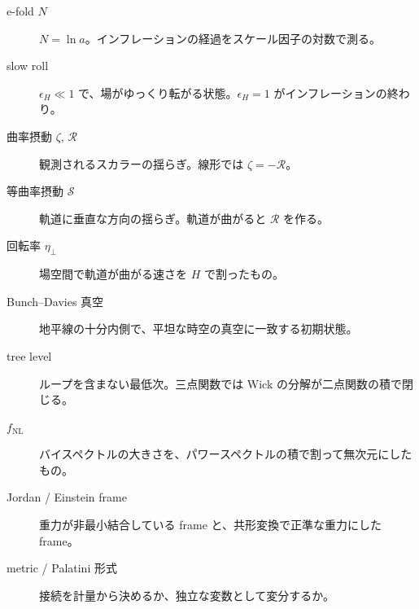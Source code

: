 \documentclass[a4paper,11pt]{ltjsarticle}
\newcommand{\fnl}{f_{\mathrm{NL}}}
\begin{document}
\begin{description}
\item[e-fold $N$] $N=\ln a$。インフレーションの経過をスケール因子の対数で測る。
\item[slow roll] $\epsilon_H\ll1$ で、場がゆっくり転がる状態。$\epsilon_H=1$ がインフレーションの終わり。
\item[曲率摂動 $\zeta$, $\mathcal R$] 観測されるスカラーの揺らぎ。線形では $\zeta=-\mathcal R$。
\item[等曲率摂動 $\mathcal S$] 軌道に垂直な方向の揺らぎ。軌道が曲がると $\mathcal R$ を作る。
\item[回転率 $\eta_\perp$] 場空間で軌道が曲がる速さを $H$ で割ったもの。
\item[Bunch--Davies 真空] 地平線の十分内側で、平坦な時空の真空に一致する初期状態。
\item[tree level] ループを含まない最低次。三点関数では Wick の分解が二点関数の積で閉じる。
\item[$\fnl$] バイスペクトルの大きさを、パワースペクトルの積で割って無次元にしたもの。
\item[Jordan / Einstein frame] 重力が非最小結合している frame と、共形変換で正準な重力にした frame。
\item[metric / Palatini 形式] 接続を計量から決めるか、独立な変数として変分するか。
\end{description}



\end{document}
